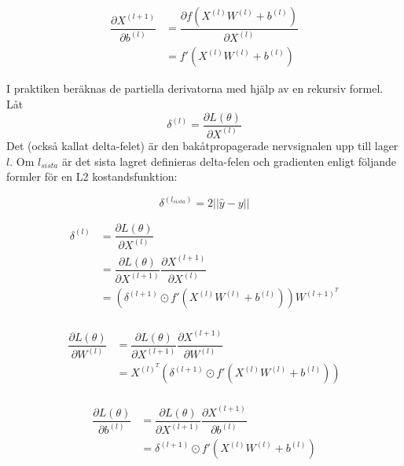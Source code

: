 \documentclass[a4paper,11pt,twoside]{article}
\newcommand*{\pd}[2]{\ensuremath{\dfrac{\partial #1}{\partial #2}}}
\begin{document}
\begin{equation}
\begin{split}
\pd{X^{(l+1)}}{b^{(l)}} 
				& = \pd{f(X^{(l)}W^{(l)} +b^{(l)})}{X^{(l)}}  \\
				& = f'(X^{(l)}W^{(l)}+b^{(l)})
\end{split}
\end{equation}

I praktiken beräknas de partiella derivatorna med hjälp av en rekursiv formel. Låt
\begin{equation}
\delta^{(l)} = \pd{L(\theta)}{X^{(l)}}
\end{equation}
Det (också kallat delta-felet) är den bakåtpropagerade nervsignalen upp till lager $l$. Om $l_{sista}$ är det sista lagret definieras delta-felen och gradienten enligt följande formler för en L2 kostandsfunktion:

\begin{equation}
\delta^{(l_{sista})} = 2 ||\hat{y}-y||
\end{equation}

\begin{equation}
\begin{split}
\delta^{(l)} 
	& = \pd{L(\theta)}{X^{(l)}} \\
	& = \pd{L(\theta)}{X^{(l+1)}} \pd{X^{(l+1)}}{X^{(l)}}\\
	& = \left( \delta^{(l+1)} \odot f'(X^{(l)}W^{(l)}+b^{(l)}) \right) W^{(l+1)^T}\\
\end{split}
\end{equation}

\begin{equation}
\begin{split}
\pd{L(\theta)}{W^{(l)}}
	& = \pd{L(\theta)}{X^{(l+1)}} \pd{X^{(l+1)}}{W^{(l)}}\\
	& = X^{(l)^T} \left( \delta^{(l+1)} \odot f'(X^{(l)} W^{(l)}+b^{(l)}) \right) \\
\end{split}
\end{equation}

\begin{equation}
\begin{split}
\pd{L(\theta)}{b^{(l)}}
	& = \pd{L(\theta)}{X^{(l+1)}} \pd{X^{(l+1)}}{b^{(l)}}\\
	& =  \delta^{(l+1)} \odot f'(X^{(l)} W^{(l)}+b^{(l)})  \\
\end{split}
\end{equation}
\end{document}

